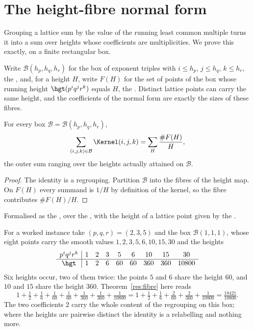 \section{The height-fibre normal form}\label{sec:fibre}

Grouping a lattice sum by the value of the running least common multiple turns
it into a sum over heights whose coefficients are multiplicities.  We prove
this exactly, on a finite rectangular box.

Write $\mathcal B(h_p,h_q,h_r)$ for the box of exponent triples with $i\le h_p$,
$j\le h_q$, $k\le h_r$, the
, and, for a height $H$, write $F(H)$ for the set of points of the box whose
running height $\hgt(p^{i}q^{j}r^{k})$ equals $H$, the
.  Distinct lattice points can carry the same height, and the coefficients
of the normal form are exactly the sizes of these fibres.

\begin{theorem}\label{res:fibre}
For every box $\mathcal B=\mathcal B(h_p,h_q,h_r)$,
\[
 \sum_{(i,j,k)\in\mathcal B}\Kernel(i,j,k)
 =\sum_{H}\frac{\#F(H)}{H},
\]
the outer sum ranging over the heights actually attained on $\mathcal B$.
\end{theorem}

\begin{proof}
The identity is a regrouping.  Partition $\mathcal B$ into the fibres of the
height map.  On $F(H)$ every summand is
$1/H$ by definition of the kernel, so the fibre contributes $\#F(H)/H$.
\end{proof}

\noindent Formalised as the
, over the
, with the height of a lattice point given by the
.

For a worked instance take $(p,q,r)=(2,3,5)$ and the box $\mathcal B(1,1,1)$,
whose eight points carry the smooth values $1,2,3,5,6,10,15,30$ and the heights
\[
\begin{array}{c|cccccccc}
p^{i}q^{j}r^{k}&1&2&3&5&6&10&15&30\\ \hline
\hgt&1&2&6&60&60&360&360&10800
\end{array}
\]
Six heights occur, two of them twice: the points $5$ and $6$ share the height
$60$, and $10$ and $15$ share the height $360$.  Theorem~\ref{res:fibre} here
reads
\[
 1+\tfrac12+\tfrac16+\tfrac1{60}+\tfrac1{60}+\tfrac1{360}+\tfrac1{360}
 +\tfrac1{10800}
 =1+\tfrac12+\tfrac16+\tfrac2{60}+\tfrac2{360}+\tfrac1{10800}
 =\tfrac{18421}{10800}.
\]
The two coefficients $2$ carry the whole content of the regrouping on this box;
where the heights are pairwise distinct the identity is a relabelling and
nothing more.

